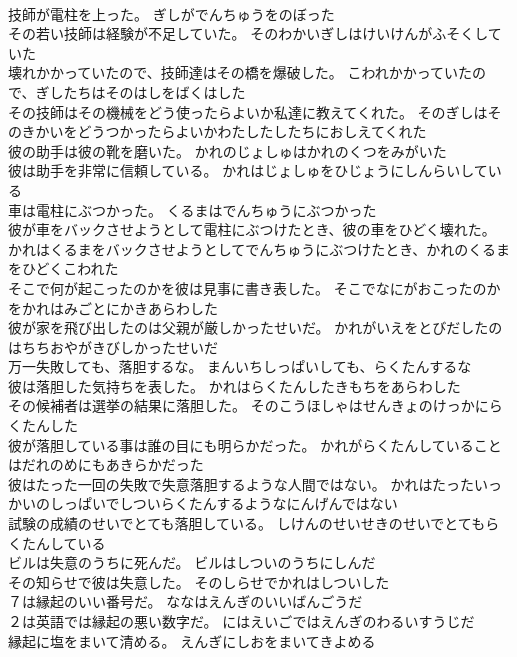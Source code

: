 \documentclass[8pt]{extreport}
\begin{document}
\begin{CJK}{UTF8}{min}
\\	技師が電柱を上った。	ぎしがでんちゅうをのぼった 
\\	その若い技師は経験が不足していた。	そのわかいぎしはけいけんがふそくしていた 
\\	壊れかかっていたので、技師達はその橋を爆破した。	こわれかかっていたので、ぎしたちはそのはしをばくはした 
\\	その技師はその機械をどう使ったらよいか私達に教えてくれた。	そのぎしはそのきかいをどうつかったらよいかわたしたしたちにおしえてくれた 
\\	彼の助手は彼の靴を磨いた。	かれのじょしゅはかれのくつをみがいた 
\\	彼は助手を非常に信頼している。	かれはじょしゅをひじょうにしんらいしている 
\\	車は電柱にぶつかった。	くるまはでんちゅうにぶつかった 
\\	彼が車をバックさせようとして電柱にぶつけたとき、彼の車をひどく壊れた。	かれはくるまをバックさせようとしてでんちゅうにぶつけたとき、かれのくるまをひどくこわれた 
\\	そこで何が起こったのかを彼は見事に書き表した。	そこでなにがおこったのかをかれはみごとにかきあらわした 
\\	彼が家を飛び出したのは父親が厳しかったせいだ。	かれがいえをとびだしたのはちちおやがきびしかったせいだ 
\\	万一失敗しても、落胆するな。	まんいちしっぱいしても、らくたんするな 
\\	彼は落胆した気持ちを表した。	かれはらくたんしたきもちをあらわした 
\\	その候補者は選挙の結果に落胆した。	そのこうほしゃはせんきょのけっかにらくたんした 
\\	彼が落胆している事は誰の目にも明らかだった。	かれがらくたんしていることはだれのめにもあきらかだった 
\\	彼はたった一回の失敗で失意落胆するような人間ではない。	かれはたったいっかいのしっぱいでしついらくたんするようなにんげんではない 
\\	試験の成績のせいでとても落胆している。	しけんのせいせきのせいでとてもらくたんしている 
\\	ビルは失意のうちに死んだ。	ビルはしついのうちにしんだ 
\\	その知らせで彼は失意した。	そのしらせでかれはしついした 
\\	７は縁起のいい番号だ。	ななはえんぎのいいばんごうだ 
\\	２は英語では縁起の悪い数字だ。	にはえいごではえんぎのわるいすうじだ 
\\	縁起に塩をまいて清める。	えんぎにしおをまいてきよめる 

\end{CJK}
\end{document}
